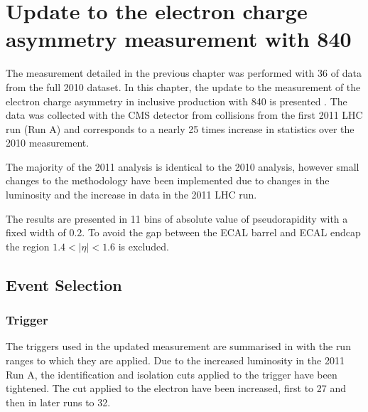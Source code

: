 \chapter[Electron Charge Asymmetry]{Update to the electron charge asymmetry
measurement with \unit{840}{\invpb} }
\label{chap:update}

The measurement detailed in the previous chapter was performed with
\unit{36}{\invpb} of data from the full 2010 dataset. 
In this chapter, the update to the measurement of the electron charge asymmetry in
inclusive \inclusiveWe production with \unit{840}{\invpb} is presented
\cite{asym840,bendavid2011electron}.
The data was collected with the {CMS} detector from collisions from the
first 2011 {LHC} run (Run A) and corresponds to a nearly 25 times increase in
statistics over the 2010 measurement.

The majority of the 2011 analysis is identical to the 2010 analysis,
however small changes to the methodology have been implemented due to changes
in the luminosity and the increase in data in the 2011 {LHC} run.

The results are presented in 11 bins of absolute value of pseudorapidity with a
fixed width of 0.2. To avoid the gap between the ECAL barrel and ECAL endcap the
region $1.4<|\eta|<1.6$ is excluded.

\section{Event Selection}

\subsection{Trigger}

The triggers used in the updated measurement are summarised in
 with the run ranges to which they are applied.
Due to the increased luminosity in the 2011 Run A, the identification and
isolation cuts applied to the trigger have been tightened. The \PT cut applied
to the electron have been increased, first to \unit{27}{\GeV} and then in later
runs to \unit{32}{\GeV}. 

